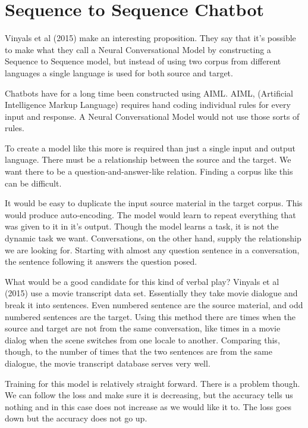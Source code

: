\section{Sequence to Sequence Chatbot}

Vinyals et al (2015)\cite{DBLP:journals/corr/VinyalsL15} make an interesting proposition. They say that it's possible to make what they call a Neural Conversational Model by constructing a Sequence to Sequence model, but instead of using two corpus from different languages a single language is used for both source and target.

Chatbots have for a long time been constructed using \ac{AIML}. AIML, (Artificial Intelligence Markup Language) requires hand coding individual rules for every input and response. A Neural Conversational Model would not use those sorts of rules.

To create a model like this more is required than just a single input and output language. There must be a relationship between the source and the target. We want there to be a question-and-answer-like relation. Finding a corpus like this can be difficult.

It would be easy to duplicate the input source material in the target corpus. This would produce auto-encoding. The model would learn to repeat everything that was given to it in it's output. Though the model learns a task, it is not the dynamic task we want. Conversations, on the other hand, supply the relationship we are looking for. Starting with almost any question sentence in a conversation, the sentence following it answers the question posed. 


What would be a good candidate for this kind of verbal play? Vinyals et al (2015)\cite{DBLP:journals/corr/VinyalsL15} use a movie transcript data set. Essentially they take movie dialogue and break it into sentences. Even numbered sentence are the source material, and odd numbered sentences are the target. Using this method there are times when the source and target are not from the same conversation, like times in a movie dialog when the scene switches from one locale to another. Comparing this, though, to the number of times that the two sentences are from the same dialogue, the movie transcript database serves very well.

Training for this model is relatively straight forward. There is a problem though. We can follow the loss and make sure it is decreasing, but the accuracy tells us nothing and in this case does not increase as we would like it to. The loss goes down but the accuracy does not go up.

